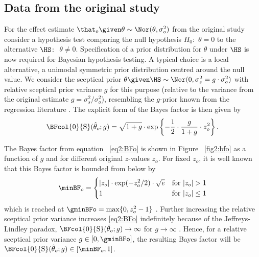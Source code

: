 \subsection{Data from the original study}
For the effect estimate $\that_o \given \theta \sim \Nor(\theta, \sigma^2_o)$
from the original study consider a hypothesis test comparing the null hypothesis
$H_0\colon$ $\theta = 0$ to the alternative $\HS \colon$ $\theta \neq 0$.
Specification of a prior distribution for $\theta$ under $\HS$ is now required
for Bayesian hypothesis testing. A typical choice \citep{Jeffreys1961} is a
local alternative, a unimodal symmetric prior distribution centred around the
null value. We consider the sceptical prior
$\theta \given \HS \sim \Nor(0, \sigma^2_s = g \cdot \sigma^2_o)$ with relative
sceptical prior variance $g$ for this purpose (relative to the variance from the
original estimate $g = \sigma^2_s/\sigma^2_o$), resembling the $g$-prior known
from the regression literature \citep{Zellner1986, Liang2008}. The explicit form
of the Bayes factor is then given by
\begin{align}
  \label{eq2:BFo}
  \BFcol{0}{\mathrm{S}}(\hat{\theta}_o; g)
  = \sqrt{1 + g} \cdot
  \exp\left\{-\frac{1}{2} \cdot \frac{g}{1 + g} \cdot z^2_o\right\}.
\end{align}

The Bayes factor from equation ~\eqref{eq2:BFo} is shown in Figure ~\ref{fig2:bfo}
as a function of $g$ and for different original $z$-values $z_o$. For fixed
$z_o$, it is well known that this Bayes factor is bounded from below by
\begin{align}
  \label{eq2:minBFo}
  \minBF_{o} =
  \begin{cases}
    |z_o| \cdot  \exp(-z_o^2/2) \cdot \sqrt{e} & \text{for} ~ |z_o| > 1 \\
    1 & \text{for} ~ |z_o| \leq 1
  \end{cases}
\end{align}
which is reached at $\gminBFo = \max\{0, z^2_o - 1\}$ \citep{Edwards1963}.
Further increasing the relative sceptical prior variance increases
\eqref{eq2:BFo} indefinitely because of the Jeffreys-Lindley paradox, \ie{}
$\BFcol{0}{\mathrm{S}}(\hat{\theta}_o; g) \to \infty$ for $g \to \infty$
\citep[][Section 6.1.4]{Bernardo2000}. Hence, for a relative sceptical prior
variance $g \in [0, \gminBFo]$, the resulting Bayes factor will be
$\BFcol{0}{\mathrm{S}}(\hat{\theta}_o; g) \in [\minBF_o, 1]$.

